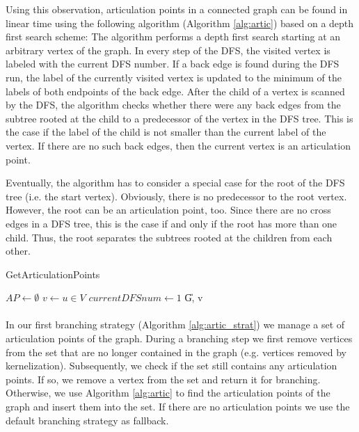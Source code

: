\documentclass[]{article}
\begin{document}
Using this observation, articulation points in a connected graph can be found in linear time using the following algorithm (Algorithm \ref{alg:artic}) based on a depth first search scheme: The algorithm performs a depth first search starting at an arbitrary vertex of the graph. In every step of the DFS, the visited vertex is labeled with the current DFS number. If a back edge is found during the DFS run, the label of the currently visited vertex is updated to the minimum of the labels of both endpoints of the back edge. After the child of a vertex is scanned by the DFS, the algorithm checks whether there were any back edges from the subtree rooted at the child to a predecessor of the vertex in the DFS tree. This is the case if the label of the child is not smaller than the current label of the vertex. If there are no such back edges, then the current vertex is an articulation point.

Eventually, the algorithm has to consider a special case for the root of the DFS tree (i.e. the start vertex). Obviously, there is no predecessor to the root vertex. However, the root can be an articulation point, too. Since there are no cross edges in a DFS tree, this is the case if and only if the root has more than one child. Thus, the root separates the subtrees rooted at the children from each other.

\begin{algorithm}
	\caption{GetArticulationPoints}\label{alg:artic}
	\DontPrintSemicolon
	
	
	$AP \leftarrow \emptyset$\; 
	$v\leftarrow u\in V$
	$currentDFSnum \leftarrow 1$\;
	\U{G, v}	
	
	\;
	
\end{algorithm}

\paragraph{}
In our first branching strategy (Algorithm \ref{alg:artic_strat}) we manage a set of articulation points of the graph. During a branching step we first remove vertices from the set that are no longer contained in the graph (e.g. vertices removed by kernelization). Subsequently, we check if the set still contains any articulation points. If so, we remove a vertex from the set and return it for branching. Otherwise, we use Algorithm \ref{alg:artic} to find the articulation points of the graph and insert them into the set. If there are no articulation points we use the default branching strategy as fallback. 
\end{document}
